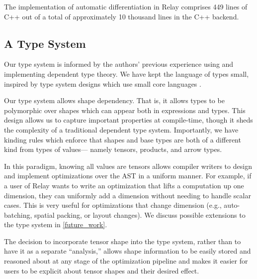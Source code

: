 The implementation of automatic differentiation in Relay comprises 449 lines of C++ out of a total of approximately 10 thousand lines in the C++ backend.

\subsection{A Type System}

Our type system is informed by the authors' previous experience using and implementing dependent type theory. We
have kept the language of types small, inspired by type system designs which use small core languages
\cite{spj_talk, lean_meta}.

Our type system allows shape dependency. That is, it allows types to be polymorphic over shapes which
can appear both in expressions and types. This design allows us to capture important properties
at compile-time, though it sheds the complexity of a traditional dependent type system. Importantly, we
have kinding rules which enforce that shapes and base types are both of a different kind from types of values---
namely tensors, products, and arrow types.

In this paradigm, knowing all values are tensors allows compiler writers to design and implement optimizations over
the AST in a uniform manner. For example, if a user of Relay wants to write an optimization that lifts a
computation up one dimension, they can uniformly add a dimension without needing to handle scalar cases.
This is very useful for optimizations that change dimension (e.g., auto-batching, spatial packing, or layout changes).
We discuss possible extensions to the type system in \ref{future_work}.

The decision to incorporate tensor shape into the type system, rather than to have it as a separate ``analysis,'' allows
shape information to be easily stored and reasoned about at any stage of the optimization pipeline and makes it easier for
users to be explicit about tensor shapes and their desired effect.


